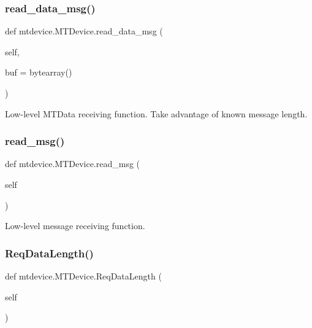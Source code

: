 \subsubsection{\texorpdfstring{read\+\_\+data\+\_\+msg()}{read\_data\_msg()}}
{\footnotesize\ttfamily def mtdevice.\+M\+T\+Device.\+read\+\_\+data\+\_\+msg (\begin{DoxyParamCaption}\item[{}]{self,  }\item[{}]{buf = {\ttfamily bytearray()} }\end{DoxyParamCaption})}

\begin{DoxyVerb}Low-level MTData receiving function.
Take advantage of known message length.
\end{DoxyVerb}
 \mbox{\label{classmtdevice_1_1MTDevice_ac5598d36cd10ab80e28d41c60281addd}} 
\subsubsection{\texorpdfstring{read\+\_\+msg()}{read\_msg()}}
{\footnotesize\ttfamily def mtdevice.\+M\+T\+Device.\+read\+\_\+msg (\begin{DoxyParamCaption}\item[{}]{self }\end{DoxyParamCaption})}

\begin{DoxyVerb}Low-level message receiving function.\end{DoxyVerb}
 \mbox{\label{classmtdevice_1_1MTDevice_a948beab4131a0748c8943d5abce96394}} 
\subsubsection{\texorpdfstring{Req\+Data\+Length()}{ReqDataLength()}}
{\footnotesize\ttfamily def mtdevice.\+M\+T\+Device.\+Req\+Data\+Length (\begin{DoxyParamCaption}\item[{}]{self }\end{DoxyParamCaption})}

